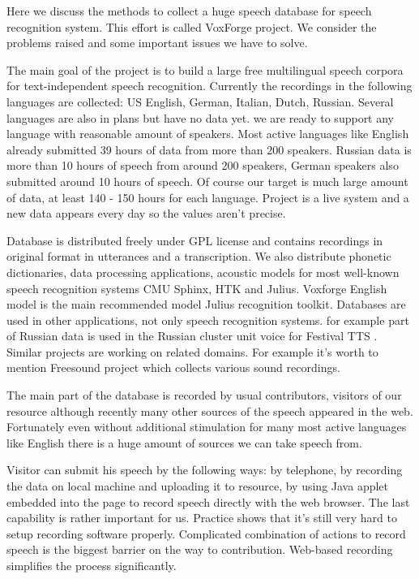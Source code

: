 \documentclass[runningheads]{llncs}
\begin{document}
Here we discuss the methods to collect a huge speech database for
speech recognition system. This effort is called VoxForge \cite{voxforge} 
project. We consider the problems raised and some important issues we have
to solve.

The main goal of the project is to build a large free multilingual speech
corpora for text-independent speech recognition. Currently
the recordings in the following languages are collected: US English, German, 
Italian, Dutch, Russian. Several languages are also in plans but have no data yet.
we are ready to support any language with reasonable amount of speakers.
Most active languages like English already submitted 39 hours of data from
more than 200 speakers. Russian data is more than 10 hours of speech from around
200 speakers, German speakers also submitted around 10 hours of speech.
Of course our target is much large amount of data, at least 140 - 150 hours for
each language. Project is a live system and a new data appears every day
so the values aren't precise.

Database is distributed freely under GPL license and contains recordings
in original format in utterances and a transcription. We also distribute
phonetic dictionaries, data processing applications, acoustic models for
most well-known speech recognition systems CMU Sphinx, HTK and Julius.
Voxforge English model is the main recommended model Julius recognition
toolkit. Databases are used in other applications, not only speech
recognition systems. for example part of Russian data is used in the
Russian cluster unit voice for Festival TTS \cite{russian}.  Similar
projects are working on related domains. For example it's worth to
mention Freesound \cite{freesound} project which collects various sound
recordings.

The main part of the database is recorded by usual contributors,
visitors of our resource although recently many other sources of the
speech appeared in the web. Fortunately even without additional
stimulation for many most active languages like English there is a huge
amount of sources we can take speech from.

Visitor can submit his speech by the following ways: by telephone, by
recording the data on local machine and uploading it to resource, by
using Java applet embedded into the page to record speech directly with
the web browser. The last capability is rather important for us.
Practice shows that it's still very hard to setup recording software
properly. Complicated combination of actions to record speech is the
biggest barrier on the way to contribution. Web-based recording
simplifies the process significantly.
\end{document}
